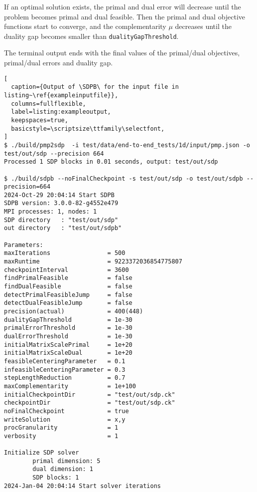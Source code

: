 \documentclass[12pt]{article}
\numberwithin{equation}{section}
\newcommand\SDPB{\texttt{SDPB}}
\begin{document}
If an optimal solution exists, the primal and dual error will decrease until the problem becomes primal and dual feasible.  Then the primal and dual objective functions start to converge, and the complementarity $\mu$ decreases until the duality gap becomes smaller than \texttt{dualityGapThreshold}.

The terminal output ends with the final values of the primal/dual objectives, primal/dual errors and duality gap.

\begin{lstlisting}[
  caption={Output of \SDPB\ for the input file in listing~\ref{exampleinputfile}},
  columns=fullflexible,
  label=listing:exampleoutput,
  keepspaces=true,
  basicstyle=\scriptsize\ttfamily\selectfont,
]
$ ./build/pmp2sdp  -i test/data/end-to-end_tests/1d/input/pmp.json -o test/out/sdp --precision 664
Processed 1 SDP blocks in 0.01 seconds, output: test/out/sdp

$ ./build/sdpb --noFinalCheckpoint -s test/out/sdp -o test/out/sdpb --precision=664
2024-Oct-29 20:04:14 Start SDPB
SDPB version: 3.0.0-82-g4552e479
MPI processes: 1, nodes: 1
SDP directory   : "test/out/sdp"
out directory   : "test/out/sdpb"

Parameters:
maxIterations                = 500
maxRuntime                   = 9223372036854775807
checkpointInterval           = 3600
findPrimalFeasible           = false
findDualFeasible             = false
detectPrimalFeasibleJump     = false
detectDualFeasibleJump       = false
precision(actual)            = 400(448)
dualityGapThreshold          = 1e-30
primalErrorThreshold         = 1e-30
dualErrorThreshold           = 1e-30
initialMatrixScalePrimal     = 1e+20
initialMatrixScaleDual       = 1e+20
feasibleCenteringParameter   = 0.1
infeasibleCenteringParameter = 0.3
stepLengthReduction          = 0.7
maxComplementarity           = 1e+100
initialCheckpointDir         = "test/out/sdp.ck"
checkpointDir                = "test/out/sdp.ck"
noFinalCheckpoint            = true
writeSolution                = x,y
procGranularity              = 1
verbosity                    = 1

Initialize SDP solver
        primal dimension: 5
        dual dimension: 1
        SDP blocks: 1
2024-Jan-04 20:04:14 Start solver iterations


\end{lstlisting}
\end{document}
